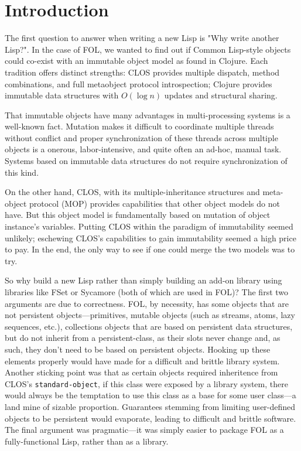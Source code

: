 \documentclass[sigconf,nonacm,review]{acmart}
\begin{document}

\maketitle

\section{Introduction}

The first question to answer when writing a new Lisp is "Why write another Lisp?". In the case of FOL, we wanted to find out if Common Lisp-style objects could co-exist with an immutable object model as found in Clojure. Each tradition offers distinct strengths: CLOS provides multiple dispatch, method combinations, and full metaobject protocol introspection; Clojure provides immutable data structures with $O(\log n)$ updates and structural sharing.

That immutable objects have many advantages in multi-processing systems is a well-known fact. Mutation makes it difficult to coordinate multiple threads without conflict and proper synchronization of these threads across multiple objects is a onerous, labor-intensive, and quite often an ad-hoc, manual task. Systems based on immutable data structures do not require synchronization of this kind.

On the other hand, CLOS, with its multiple-inheritance structures and meta-object protocol (MOP) provides capabilities that other object models do not have. But this object model is fundamentally based on mutation of object instance's variables. Putting CLOS within the paradigm of immutability seemed unlikely; eschewing CLOS's capabilities to gain immutability seemed a high price to pay. In the end, the only way to see if one could merge the two models was to try.

So why build a new Lisp rather than simply building an add-on library using libraries like FSet or Sycamore (both of which are used in FOL)? The first two arguments are due to correctness. FOL, by necessity, has some objects that are not persistent objects---primitives, mutable objects (such as streams, atoms, lazy sequences, etc.), collections objects that are based on persistent data structures, but do not inherit from a persistent-class, as their slots never change and, as such, they don't need to be based on persistent objects. Hooking up these elements properly would have made for a difficult and brittle library system. Another sticking point was that as certain objects required inheritence from CLOS's \texttt{standard-object}, if this class were exposed by a library system, there would always be the temptation to use this class as a base for some user class---a land mine of sizable proportion. Guarantees stemming from limiting user-defined objects to be persistent would evaporate, leading to difficult and brittle software. The final argument was pragmatic---it was simply easier to package FOL as a fully-functional Lisp, rather than as a library.
\end{document}
